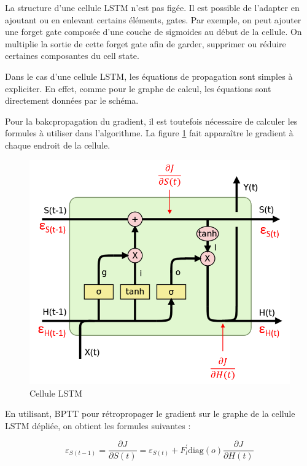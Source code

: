 La structure d'une cellule LSTM n'est pas figée. Il est possible de l'adapter en ajoutant ou en enlevant certains éléments, gates. Par exemple, on peut ajouter une forget gate composée d'une couche de sigmoides au début de la cellule. On multiplie la sortie de cette forget gate afin de garder, supprimer ou réduire certaines composantes du cell state. 

\break

Dans le cas d'une cellule LSTM, les équations de propagation sont simples à expliciter. En effet, comme pour le graphe de calcul, les équations sont directement données par le schéma.

Pour la bakcpropagation du gradient, il est toutefois nécessaire de calculer les formules à utiliser dans l'algorithme. La figure \ref{cellule LSTM gradient} fait apparaître le gradient à chaque endroit de la cellule.

\begin{figure}[h!]
\begin{center}
\includegraphics[scale=0.3]{images/chapter6/LSTM_gradient.png}
\caption{Cellule LSTM}
\label{cellule LSTM gradient}
\end{center}
\end{figure}


En utilisant, BPTT pour rétropropager le gradient sur le graphe de la cellule LSTM dépliée, on obtient les formules suivantes :

\begin{equation}
\varepsilon_{S(t-1)} = \frac{\partial J}{\partial S(t)} = \varepsilon_{S(t)} + F_{l}^{\prime}\text{diag}(o)\frac{\partial J}{\partial H(t)}
\end{equation}


